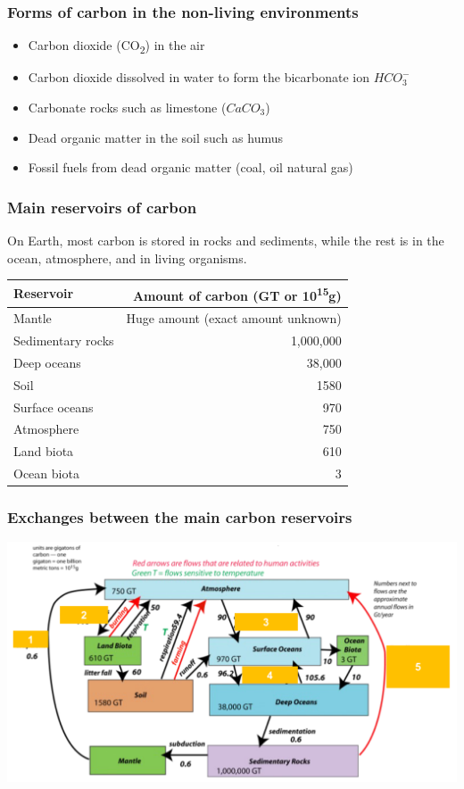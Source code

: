 \documentclass[11pt]{article}
\begin{document}
\subsubsection{Forms of carbon in the non-living environments}
\label{sec:org3922368}
\begin{itemize}
\item Carbon dioxide (CO\textsubscript{2}) in the air
\item Carbon dioxide dissolved in water to form the bicarbonate ion \(HCO_{3}^{-}\)
\item Carbonate rocks such as limestone (\(CaCO_{3}\))
\item Dead organic matter in the soil such as humus
\item Fossil fuels from dead organic matter (coal, oil natural gas)
\end{itemize}

\subsubsection{Main reservoirs of carbon}
\label{sec:org86c391f}
On Earth, most carbon is stored in rocks and sediments, while the rest is in the ocean, atmosphere, and in living organisms.
\begin{center}
\begin{tabular}{l|r}
\textbf{Reservoir} & Amount of carbon (GT or 10\textsuperscript{15}g)\\[0pt]
\hline
Mantle & Huge amount (exact amount unknown)\\[0pt]
Sedimentary rocks & 1,000,000\\[0pt]
Deep oceans & 38,000\\[0pt]
Soil & 1580\\[0pt]
Surface oceans & 970\\[0pt]
Atmosphere & 750\\[0pt]
Land biota & 610\\[0pt]
Ocean biota & 3\\[0pt]
\end{tabular}
\end{center}

\subsubsection{Exchanges between the main carbon reservoirs}
\label{sec:org5676843}
\begin{center}
\includegraphics[width=.9\linewidth]{./images/carbon-reservoir-exchanges.png}
\end{center}
\end{document}
